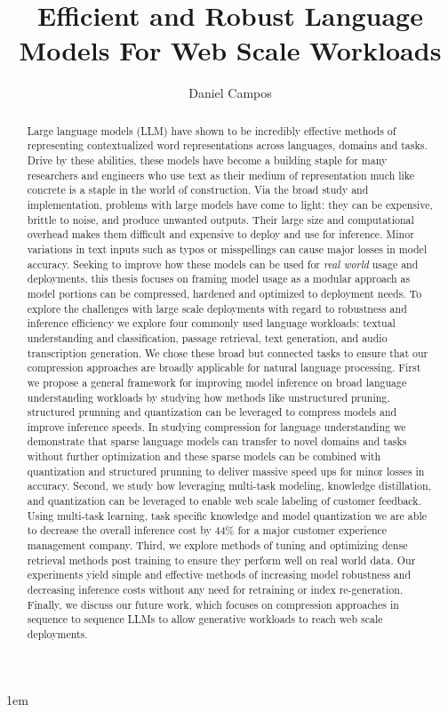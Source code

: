 \documentclass[draftthesis,tocnosub,noragright,centerchapter,fullpagesingle,12pt]{uiuc_csthesis21}
\title{Efficient and Robust Language Models For Web Scale Workloads}
\author{Daniel Campos}
\theoremstyle{definition}
\numberwithin{algocf}{chapter}
\begin{document}
\maketitle
\parindent 1em%

\frontmatter
\begin{abstract}
Large language models (LLM) have shown to be incredibly effective methods of representing contextualized word representations across languages, domains and tasks. Drive by these abilities, these models have become a building staple for many researchers and engineers who use text as their medium of representation much like concrete is a staple in the world of construction. Via the broad study and implementation, problems with large models have come to light: they can be expensive, brittle to noise, and produce unwanted outputs. Their large size and computational overhead makes them difficult and expensive to deploy and use for inference. Minor variations in text inputs such as typos or misspellings can cause major losses in model accuracy. Seeking to improve how these models can be used for \textit{real world} usage and deployments, this thesis focuses on framing model usage as a modular approach as model portions can be compressed, hardened and optimized to deployment needs. To explore the challenges with large scale deployments with regard to robustness and inference efficiency we explore four commonly used language workloads: textual understanding and classification, passage retrieval, text generation, and audio transcription generation. We chose these broad but connected tasks to ensure that our compression approaches are broadly applicable for natural language processing. First we propose a general framework for improving model inference on broad language understanding workloads by studying how methods like unstructured pruning, structured prunning and quantization can be leveraged to compress models and improve inference speeds. In studying compression for language understanding we demonstrate that sparse language models can transfer to novel domains and tasks without further optimization and these sparse models can be combined with quantization and structured prunning to deliver massive speed ups for minor losses in accuracy. Second, we study how leveraging multi-task modeling, knowledge distillation, and quantization can be leveraged to enable web scale labeling of customer feedback. Using multi-task learning, task specific knowledge and model quantization we are able to decrease the overall inference cost by 44\% for a major customer experience management company.  Third, we explore methods of tuning and optimizing dense retrieval methods post training to ensure they perform well on real world data. Our experiments yield simple and effective methods of increasing model robustness and decreasing inference costs without any need for retraining or index re-generation. Finally, we discuss our future work, which focuses on compression approaches in sequence to sequence LLMs to allow generative workloads to reach web scale deployments.
\end{abstract}
\tableofcontents
\end{document}
